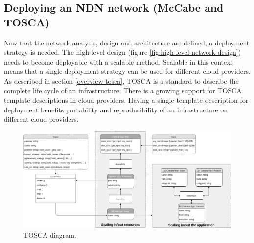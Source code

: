 \subsection{Deploying an NDN network (McCabe and TOSCA)}
\label{planning-deploying}
Now that the network analysis, design and architecture are defined, a deployment strategy is needed. The high-level design (figure \ref{fig:high-level-network-design}) needs to become deployable with a scalable method. Scalable in this context means that a single deployment strategy can be used for different cloud providers. As described in section \ref{overview-tosca}, TOSCA is a standard to describe the complete life cycle of an infrastructure. There is a growing support for TOSCA template descriptions in cloud providers. Having a single template description for deployment benefits portability and reproducibility of an infrastructure on different cloud providers.

\begin{figure}[H]
\centering
\includegraphics[width=\columnwidth]{Images/tosca-diagram.png}
\caption{TOSCA diagram.}
\label{fig:tosca-diagram}
\end{figure}

